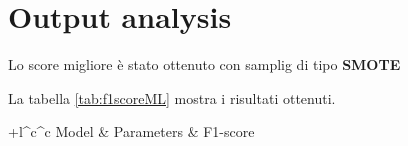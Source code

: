 \section{Output analysis}
        
        Lo score migliore è stato ottenuto con samplig di tipo \textbf{SMOTE}
        \bigbreak
        
        La tabella \ref{tab:f1scoreML} mostra i risultati ottenuti.
        
        \begin{center}
                \begin{tabular}{+l^c^c}
                        \toprule\rowstyle{\bfseries}
                        Model & Parameters & F1-score \\
                        \toprule
                        

\end{tabular}
\end{center}
